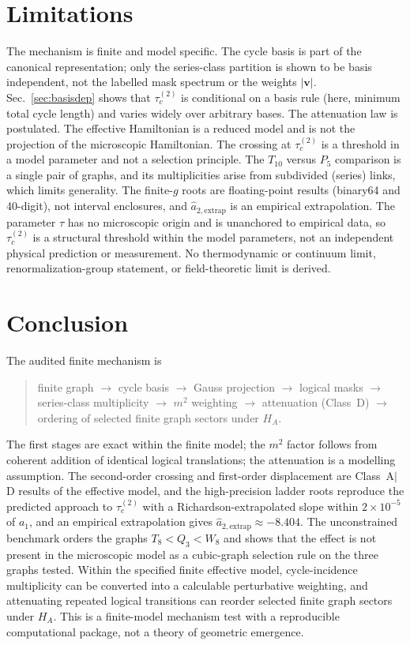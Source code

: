 \documentclass[10pt,twocolumn]{article}
\theoremstyle{definition}
\newcommand{\Tten}{T_{10}}
\newcommand{\Pfive}{P_5}
\newcommand{\tauc}{\tau_c^{(2)}}
\begin{document}
\section{Limitations}
The mechanism is finite and model specific. The cycle basis is part of the canonical representation; only the series-class partition is shown to be basis independent, not the labelled mask spectrum or the weights $|\mathbf v|$. Sec.~\ref{sec:basisdep} shows that $\tauc$ is conditional on a basis rule (here, minimum total cycle length) and varies widely over arbitrary bases. The attenuation law is postulated. The effective Hamiltonian is a reduced model and is not the projection of the microscopic Hamiltonian. The crossing at $\tauc$ is a threshold in a model parameter and not a selection principle. The $\Tten$ versus $\Pfive$ comparison is a single pair of graphs, and its multiplicities arise from subdivided (series) links, which limits generality. The finite-$g$ roots are floating-point results (binary64 and 40-digit), not interval enclosures, and $\hat a_{2,\mathrm{extrap}}$ is an empirical extrapolation. The parameter $\tau$ has no microscopic origin and is unanchored to empirical data, so $\tauc$ is a structural threshold within the model parameters, not an independent physical prediction or measurement. No thermodynamic or continuum limit, renormalization-group statement, or field-theoretic limit is derived.

\section{Conclusion}
The audited finite mechanism is
\begin{quote}\small finite graph $\to$ cycle basis $\to$ Gauss projection $\to$ logical masks $\to$ series-class multiplicity $\to$ $m^2$ weighting $\to$ attenuation (Class~D) $\to$ ordering of selected finite graph sectors under $H_A$.\end{quote}
The first stages are exact within the finite model; the $m^2$ factor follows from coherent addition of identical logical translations; the attenuation is a modelling assumption. The second-order crossing and first-order displacement are Class~A$|$D results of the effective model, and the high-precision ladder roots reproduce the predicted approach to $\tauc$ with a Richardson-extrapolated slope within $2\times10^{-5}$ of $a_1$, and an empirical extrapolation gives $\hat a_{2,\mathrm{extrap}}\approx-8.404$. The unconstrained benchmark orders the graphs $T_8<Q_3<W_8$ and shows that the effect is not present in the microscopic model as a cubic-graph selection rule on the three graphs tested. Within the specified finite effective model, cycle-incidence multiplicity can be converted into a calculable perturbative weighting, and attenuating repeated logical transitions can reorder selected finite graph sectors under $H_A$. This is a finite-model mechanism test with a reproducible computational package, not a theory of geometric emergence.
\end{document}
